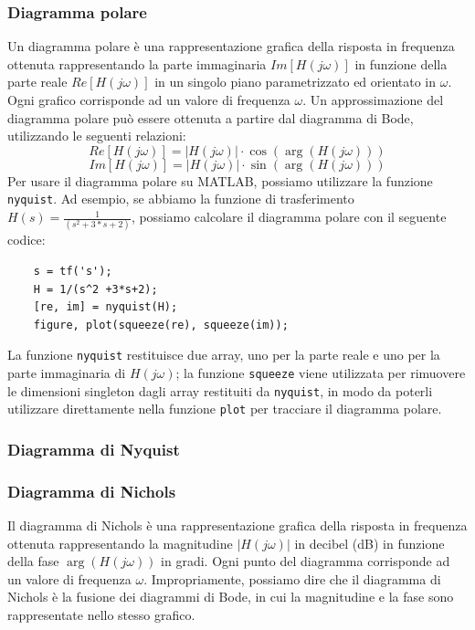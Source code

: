\subsubsection{Diagramma polare}
Un diagramma polare è una rappresentazione grafica della risposta in frequenza
ottenuta rappresentando la parte immaginaria $Im[H(j\omega)]$ in funzione della
parte reale $Re[H(j\omega)]$ in un singolo piano parametrizzato ed orientato in
$\omega$. Ogni grafico corrisponde ad un valore di frequenza $\omega$. Un
approssimazione del diagramma polare può essere ottenuta a partire dal
diagramma di Bode, utilizzando le seguenti relazioni:
\begin{equation}
    Re[H(j\omega)] = |H(j\omega)| \cdot \cos(\arg(H(j\omega)))
\end{equation}
\begin{equation}
    Im[H(j\omega)] = |H(j\omega)| \cdot \sin(\arg(H(j\omega)))
\end{equation}
Per usare il diagramma polare su MATLAB, possiamo utilizzare la funzione \verb|nyquist|. Ad esempio, se abbiamo la funzione di trasferimento $H(s) = \frac{1}{(s^2 +3*s+2)}$, possiamo calcolare il diagramma polare con il seguente codice:
\begin{verbatim}
    s = tf('s');
    H = 1/(s^2 +3*s+2);
    [re, im] = nyquist(H);
    figure, plot(squeeze(re), squeeze(im));
\end{verbatim}
La funzione \verb|nyquist| restituisce due array, uno per la parte reale e uno
per la parte immaginaria di $H(j\omega)$; la funzione \verb|squeeze| viene
utilizzata per rimuovere le dimensioni singleton dagli array restituiti da
\verb|nyquist|, in modo da poterli utilizzare direttamente nella funzione
\verb|plot| per tracciare il diagramma polare.
\subsubsection{Diagramma di Nyquist}

\subsubsection{Diagramma di Nichols}
Il diagramma di Nichols è una rappresentazione grafica della risposta in
frequenza ottenuta rappresentando la magnitudine $|H(j\omega)|$ in decibel (dB)
in funzione della fase $\arg(H(j\omega))$ in gradi. Ogni punto del diagramma
corrisponde ad un valore di frequenza $\omega$. Impropriamente, possiamo dire
che il diagramma di Nichols è la fusione dei diagrammi di Bode, in cui la
magnitudine e la fase sono rappresentate nello stesso grafico.